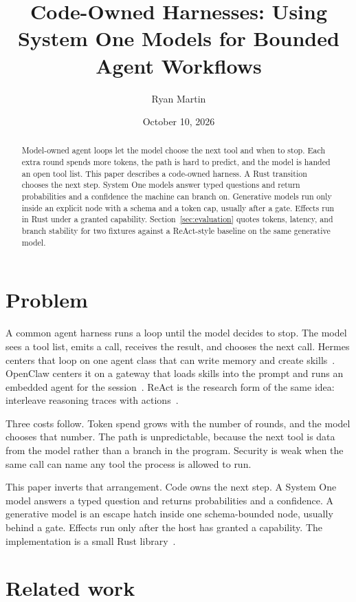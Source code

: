 \documentclass[11pt]{article}
\title{Code-Owned Harnesses: Using System One Models for Bounded Agent Workflows}
\author{Ryan Martin}
\date{October 10, 2026}
\begin{document}
\maketitle

\begin{abstract}
Model-owned agent loops let the model choose the next tool and when to stop.
Each extra round spends more tokens, the path is hard to predict, and the model
is handed an open tool list. This paper describes a code-owned harness. A Rust
transition chooses the next step. System One models answer typed questions and
return probabilities and a confidence the machine can branch on. Generative
models run only inside an explicit node with a schema and a token cap, usually
after a gate. Effects run in Rust under a granted capability.
Section~\ref{sec:evaluation} quotes tokens, latency, and branch stability
for two fixtures against a ReAct-style baseline on the same generative model.
\end{abstract}

\section{Problem}
\label{sec:problem}

A common agent harness runs a loop until the model decides to stop. The model
sees a tool list, emits a call, receives the result, and chooses the next call.
Hermes centers that loop on one agent class that can write memory and create
skills~\cite{hermes-loop}. OpenClaw centers it on a gateway that loads skills
into the prompt and runs an embedded agent for the session~\cite{openclaw-loop}.
ReAct is the research form of the same idea: interleave reasoning traces with
actions~\cite{yao2023react}.

Three costs follow. Token spend grows with the number of rounds, and the model
chooses that number. The path is unpredictable, because the next tool is data
from the model rather than a branch in the program. Security is weak when the
same call can name any tool the process is allowed to run.

This paper inverts that arrangement. Code owns the next step. A System One
model answers a typed question and returns probabilities and a confidence.
A generative model is an escape hatch inside one schema-bounded node, usually
behind a gate. Effects run only after the host has granted a capability.
The implementation is a small Rust library~\cite{seaotter-agent}.

\section{Related work}
\label{sec:related}
\end{document}
